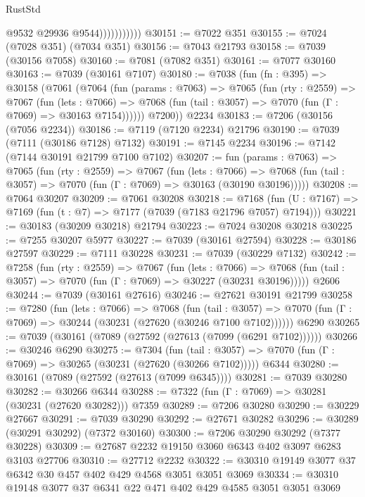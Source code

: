\begin{lexlean}{RustStd}
\begin{coremodule}
                          @9532
                          @29936
                          @9544)))))))))))
@30151 := @7022 @351
@30155 := @7024 (@7028 @351) (@7034 @351)
@30156 := @7043 @21793
@30158 := @7039 (@30156 @7058)
@30160 := @7081 (@7082 @351)
@30161 := @7077 @30160
@30163 := @7039 (@30161 @7107)
@30180 := @7038
    (fun (fn : @395) =>
    @30158
      (@7061
        (@7064
          (fun (params : @7063) =>
          @7065
            (fun (rty : @2559) =>
            @7067
              (fun (lets : @7066) =>
              @7068 (fun (tail : @3057) => @7070 (fun (Γ : @7069) => @30163 @7154))))))
        @7200))
    @2234
@30183 := @7206 (@30156 (@7056 @2234))
@30186 := @7119 (@7120 @2234) @21796
@30190 := @7039 (@7111 (@30186 @7128) @7132)
@30191 := @7145 @2234
@30196 := @7142 (@7144 @30191 @21799 @7100 @7102)
@30207 := fun (params : @7063) =>
  @7065
    (fun (rty : @2559) =>
    @7067
      (fun (lets : @7066) =>
      @7068 (fun (tail : @3057) => @7070 (fun (Γ : @7069) => @30163 (@30190 @30196)))))
@30208 := @7064 @30207
@30209 := @7061 @30208
@30218 := @7168
    (fun (U : @7167) => @7169 (fun (t : @7) => @7177 (@7039 (@7183 @21796 @7057) @7194)))
@30221 := @30183 (@30209 @30218) @21794
@30223 := @7024 @30208 @30218
@30225 := @7255 @30207 @5977
@30227 := @7039 (@30161 @27594)
@30228 := @30186 @27597
@30229 := @7111 @30228
@30231 := @7039 (@30229 @7132)
@30242 := @7258
    (fun (rty : @2559) =>
    @7067
      (fun (lets : @7066) =>
      @7068 (fun (tail : @3057) => @7070 (fun (Γ : @7069) => @30227 (@30231 @30196)))))
    @2606
@30244 := @7039 (@30161 @27616)
@30246 := @27621 @30191 @21799
@30258 := @7280
    (fun (lets : @7066) =>
    @7068
      (fun (tail : @3057) =>
      @7070 (fun (Γ : @7069) => @30244 (@30231 (@27620 (@30246 @7100 @7102))))))
    @6290
@30265 := @7039 (@30161 (@7089 (@27592 (@27613 (@7099 (@6291 @7102))))))
@30266 := @30246 @6290
@30275 := @7304
    (fun (tail : @3057) => @7070 (fun (Γ : @7069) => @30265 (@30231 (@27620 (@30266 @7102)))))
    @6344
@30280 := @30161 (@7089 (@27592 (@27613 (@7099 @6345))))
@30281 := @7039 @30280
@30282 := @30266 @6344
@30288 := @7322 (fun (Γ : @7069) => @30281 (@30231 (@27620 @30282))) @7359
@30289 := @7206 @30280
@30290 := @30229 @27667
@30291 := @7039 @30290
@30292 := @27671 @30282
@30296 := @30289 (@30291 @30292) (@7372 @30160)
@30300 := @7206 @30290 @30292 (@7377 @30228)
@30309 := @27687 @2232 @19150 @3060 @6343 @402 @3097 @6283 @3103 @27706
@30310 := @27712 @2232
@30322 := @30310 @19149 @3077 @37 @6342 @30 @457 @402 @429 @4568 @3051 @3051 @3069
@30334 := @30310 @19148 @3077 @37 @6341 @22 @471 @402 @429 @4585 @3051 @3051 @3069

\end{coremodule}
\end{lexlean}
